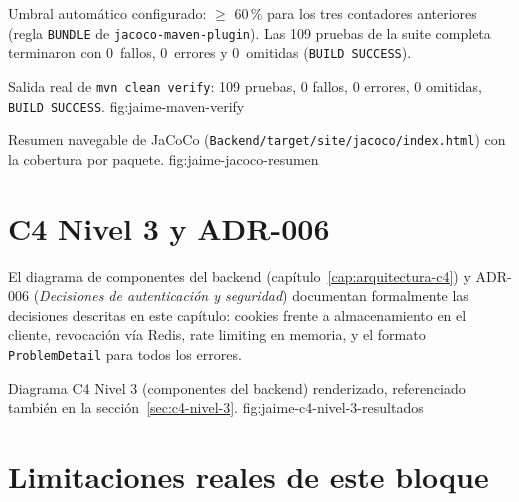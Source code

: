 Umbral autom\'atico configurado: \(\geq\) 60\,\% para los tres contadores
anteriores (regla \texttt{BUNDLE} de \texttt{jacoco-maven-plugin}). Las 109
pruebas de la suite completa terminaron con 0~fallos, 0~errores y
0~omitidas (\texttt{BUILD SUCCESS}).

%
{Salida real de \texttt{mvn clean verify}: 109 pruebas, 0 fallos, 0 errores, 0 omitidas, \texttt{BUILD SUCCESS}.}%
{fig:jaime-maven-verify}

%
{Resumen navegable de JaCoCo (\texttt{Backend/target/site/jacoco/index.html}) con la cobertura por paquete.}%
{fig:jaime-jacoco-resumen}

\section{C4 Nivel 3 y ADR-006}

El diagrama de componentes del backend (cap\'itulo~\ref{cap:arquitectura-c4})
y ADR-006 (\emph{Decisiones de autenticaci\'on y seguridad}) documentan
formalmente las decisiones descritas en este cap\'itulo: cookies frente a
almacenamiento en el cliente, revocaci\'on v\'ia Redis, rate limiting en
memoria, y el formato \texttt{ProblemDetail} para todos los errores.

%
{Diagrama C4 Nivel 3 (componentes del backend) renderizado, referenciado tambi\'en en la secci\'on~\ref{sec:c4-nivel-3}.}%
{fig:jaime-c4-nivel-3-resultados}

\section{Limitaciones reales de este bloque}

